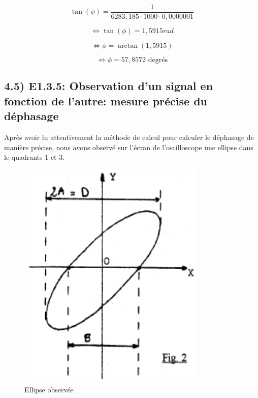 \documentclass{report}
\begin{document}
\begin{equation}
    \tan(\phi) = \frac{1}{6283,185 \cdot 1000 \cdot 0,0000001}
\end{equation}

\begin{equation}
    \Leftrightarrow \tan(\phi) = 1,5915 rad
\end{equation}

\begin{equation}
    \Leftrightarrow \phi = \arctan (1,5915)
\end{equation}

\begin{equation}
    \Leftrightarrow \phi = 57,8572 \text{ degr\'es}
\end{equation}

\subsection*{4.5) E1.3.5: Observation d'un signal en fonction de l'autre: mesure pr\'ecise du d\'ephasage}
\hspace*{0.5cm}
Apr\`es avoir lu attentivement la m\'ethode de calcul pour calculer le d\'ephasage de mani\`ere pr\'ecise, nous avons observ\'e sur l'\'ecran de l'oscilloscope une ellipse dans le quadrants 1 et 3.
\hspace*{0.5cm}
\begin{figure}[ht!]
\centering
\includegraphics[width=90mm]{circuitE1.3.5.png}
\caption{Ellipse observ\'ee}
\label{overflow}
\end{figure}
\\
\end{document}
